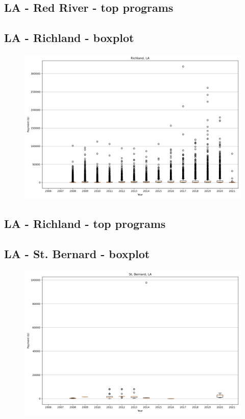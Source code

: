\subsection*{LA - Red River - top programs}

\newpage
\subsection*{LA - Richland - boxplot}
\begin{figure}[h]
\centering
\includegraphics[width=7in]{../output/boxplots/counties/Richland-LA_boxplot.png}
\end{figure}


\subsection*{LA - Richland - top programs}

\newpage
\subsection*{LA - St. Bernard - boxplot}
\begin{figure}[h]
\centering
\includegraphics[width=7in]{../output/boxplots/counties/St. Bernard-LA_boxplot.png}
\end{figure}


